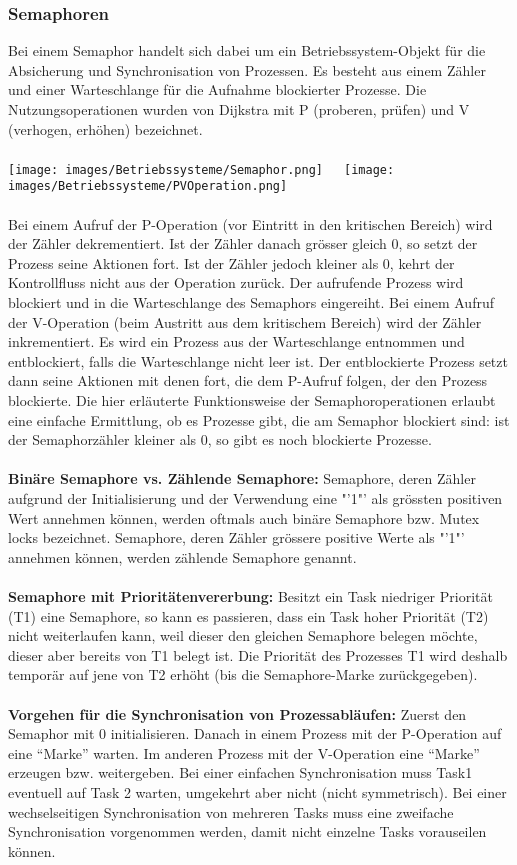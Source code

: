 \subsubsection{Semaphoren}
Bei einem Semaphor handelt sich dabei um ein Betriebssystem-Objekt für die Absicherung und Synchronisation von Prozessen. Es besteht aus einem Zähler und einer Warteschlange für die Aufnahme blockierter Prozesse. Die Nutzungsoperationen wurden von Dijkstra mit P (proberen, prüfen) und V (verhogen, erhöhen) bezeichnet.\\ \\
\texttt{[image: images/Betriebssysteme/Semaphor.png]}\ \ \
\texttt{[image: images/Betriebssysteme/PVOperation.png]}\\\\
Bei einem Aufruf der P-Operation (vor Eintritt in den kritischen Bereich) wird der Zähler dekrementiert. Ist der Zähler danach grösser gleich 0, so setzt der Prozess seine Aktionen fort. Ist der Zähler jedoch kleiner als 0, kehrt der Kontrollfluss nicht aus der Operation zurück. Der aufrufende Prozess wird blockiert und in die Warteschlange des Semaphors eingereiht. Bei einem Aufruf der V-Operation (beim Austritt aus dem kritischem Bereich) wird der Zähler inkrementiert. Es wird ein Prozess aus der Warteschlange entnommen und entblockiert, falls die Warteschlange nicht leer ist. Der entblockierte Prozess setzt dann seine Aktionen mit denen fort, die dem P-Aufruf folgen, der den Prozess blockierte. Die hier erläuterte Funktionsweise der Semaphoroperationen erlaubt eine einfache Ermittlung, ob es Prozesse gibt, die am Semaphor blockiert sind: ist der Semaphorzähler kleiner als 0, so gibt es noch blockierte Prozesse.\\\\
\textbf{Binäre Semaphore vs. Zählende Semaphore:}
Semaphore, deren Zähler aufgrund der Initialisierung und der Verwendung eine "'1"' als grössten positiven Wert annehmen können, werden oftmals auch binäre Semaphore bzw. Mutex locks bezeichnet. Semaphore, deren Zähler grössere positive Werte als "'1"' annehmen können, werden zählende Semaphore genannt.\\\\
\textbf{Semaphore mit Prioritätenvererbung:} Besitzt ein Task niedriger Priorität (T1) eine Semaphore, so kann es passieren, dass ein Task hoher Priorität (T2) nicht weiterlaufen kann, weil dieser den gleichen Semaphore belegen möchte, dieser aber bereits von T1 belegt ist. Die Priorität des Prozesses T1 wird deshalb temporär auf jene von T2 erhöht (bis die Semaphore-Marke zurückgegeben).\\\\
\textbf{Vorgehen für die Synchronisation von Prozessabläufen:} Zuerst den Semaphor mit 0 initialisieren. Danach in einem Prozess mit der P-Operation auf eine "`Marke"' warten. Im anderen Prozess mit der V-Operation eine "`Marke"' erzeugen bzw. weitergeben. Bei einer einfachen Synchronisation muss Task1 eventuell auf Task 2 warten, umgekehrt aber nicht (nicht symmetrisch). Bei einer wechselseitigen Synchronisation von mehreren Tasks muss eine zweifache Synchronisation vorgenommen werden, damit nicht einzelne Tasks vorauseilen können. 

